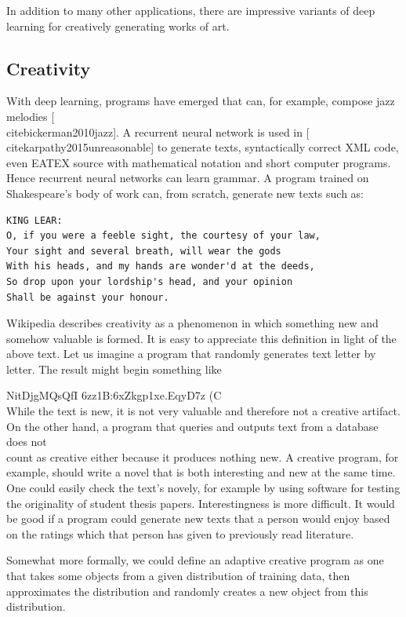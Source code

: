 \documentclass[10pt]{book}
\begin{document}
In addition to many other applications, there are impressive variants of deep learning for creatively generating works of art.

\subsection*{Creativity}
With deep learning, programs have emerged that can, for example, compose jazz melodies [\\cite{bickerman2010jazz}]. A recurrent neural network is used in [\\cite{karpathy2015unreasonable}] to generate texts, syntactically correct XML code, even EATEX source with mathematical notation and short computer programs. Hence recurrent neural networks can learn grammar. A program trained on Shakespeare's body of work can, from scratch, generate new texts such as:

\begin{verbatim}
KING LEAR:
O, if you were a feeble sight, the courtesy of your law,
Your sight and several breath, will wear the gods
With his heads, and my hands are wonder'd at the deeds,
So drop upon your lordship's head, and your opinion
Shall be against your honour.
\end{verbatim}

Wikipedia describes creativity as a phenomenon in which something new and somehow valuable is formed. It is easy to appreciate this definition in light of the above text. Let us imagine a program that randomly generates text letter by letter. The result might begin something like

NitDjgMQsQfI 6zz1B:6xZkgp1xe.EqyD7z (C\\
While the text is new, it is not very valuable and therefore not a creative artifact. On the other hand, a program that queries and outputs text from a database does not\\
count as creative either because it produces nothing new. A creative program, for example, should write a novel that is both interesting and new at the same time. One could easily check the text's novely, for example by using software for testing the originality of student thesis papers. Interestingness is more difficult. It would be good if a program could generate new texts that a person would enjoy based on the ratings which that person has given to previously read literature.

Somewhat more formally, we could define an adaptive creative program as one that takes some objects from a given distribution of training data, then approximates the distribution and randomly creates a new object from this distribution.
\end{document}
